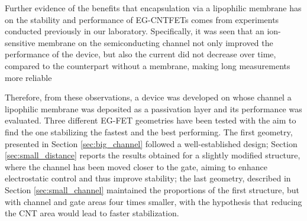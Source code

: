 Further evidence of the benefits that encapsulation via a lipophilic membrane has on the stability and performance of EG-CNTFETs comes from experiments conducted previously in our laboratory. Specifically, it was seen that an ion-sensitive membrane on the semiconducting channel not only improved the performance of the device, but also the current did not decrease over time, compared to the counterpart without a membrane, making long measurements more reliable \citep{petrelliFlexible2022,petrelliNovel2022,petrelliMethod2023}

Therefore, from these observations, a device was developed on whose channel a lipophilic membrane was deposited as a passivation layer and its performance was evaluated. Three different EG-FET geometries have been tested with the aim to find the one stabilizing the fastest and the best performing. The first geometry, presented in Section \ref{sec:big_channel} followed a well-established design; Section \ref{sec:small_distance} reports the results obtained for a slightly modified structure, where the channel has been moved closer to the gate, aiming to enhance electrostatic control and thus improve stability; the last geometry, described in Section \ref{sec:small_channel} maintained the proportions of the first structure, but with channel and gate areas four times smaller, with the hypothesis that reducing the CNT area would lead to faster stabilization.